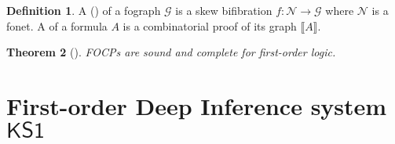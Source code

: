 \documentclass[conference,twosided,10pt]{IEEEtran}
\newtheorem{thm}{Theorem}%
\theoremstyle{definition}
\newtheorem{definition}[thm]{Definition}
\newcommand{\graph}[1]{\mathcal{#1}}
\newcommand{\gG}{\graph{G}}
\newcommand{\gN}{\graph{N}}
\newcommand*{\FOKS}{\mathsf{KS1}}
\newcommand{\graphof}[1]{\llbracket#1\rrbracket}
\begin{document}

\begin{definition}
A  () of a fograph $\gG$ is a skew
bifibration $f: \gN \rightarrow \gG$ where $\gN$ is a fonet. A  of a formula $A$ is a combinatorial proof of its graph
$\graphof{A}$.
\end{definition}

\begin{thm}[\cite{hughes:fopws}]
  \label{thm:FOCP}
  FOCPs are sound and complete for first-order logic.
\end{thm}



\section{First-order Deep Inference system $\FOKS$}\label{sec:foks}
\end{document}

